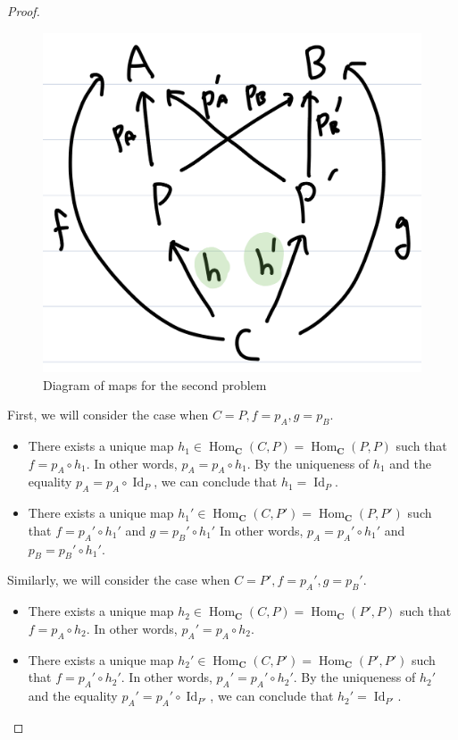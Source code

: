 \documentclass[12pt, psamsfonts]{amsart}
\theoremstyle{definition}
\theoremstyle{remark}
\DeclareMathOperator{\Hom}{Hom}
\DeclareMathOperator{\Id}{Id}
\numberwithin{equation}{section}
\begin{document}
\begin{proof}
  \begin{figure}
    \includegraphics[width=\linewidth]{maps.jpeg}
      \caption{Diagram of maps for the second problem}
    \label{fig:maps}
  \end{figure}

  First, we will consider the case when $C = P, f = p_A, g = p_B$.

  \begin{itemize}
    \item
      There exists a unique map $h_1 \in \Hom_{\mathbf{C}}(C, P) = \Hom_{\mathbf{C}}(P, P)$ such that $f = p_A \circ h_1$.
      In other words, $p_A = p_A \circ h_1$.
      By the uniqueness of $h_1$ and the equality $p_A = p_A \circ \Id_P$, we can conclude that $h_1 = \Id_P$.
    \item
      There exists a unique map $h_1' \in \Hom_{\mathbf{C}}(C, P') = \Hom_{\mathbf{C}}(P, P')$ such that $f = p_A' \circ h_1'$ and $g = p_B' \circ h_1'$
      In other words, $p_A = p_A' \circ h_1'$ and $p_B = p_B' \circ h_1'$.
  \end{itemize}


  Similarly, we will consider the case when $C = P', f = p_A', g = p_B'$.

  \begin{itemize}
    \item
      There exists a unique map $h_2 \in \Hom_{\mathbf{C}}(C, P) = \Hom_{\mathbf{C}}(P', P)$ such that $f = p_A \circ h_2$.
      In other words, $p_A' = p_A \circ h_2$.
    \item
      There exists a unique map $h_2' \in \Hom_{\mathbf{C}}(C, P') = \Hom_{\mathbf{C}}(P', P')$ such that $f = p_A' \circ h_2'$.
      In other words, $p_A' = p_A' \circ h_2'$.
      By the uniqueness of $h_2'$ and the equality $p_A' = p_A' \circ \Id_{P'}$, we can conclude that $h_2' = \Id_{P'}$.
  \end{itemize}


\end{proof}
\end{document}
